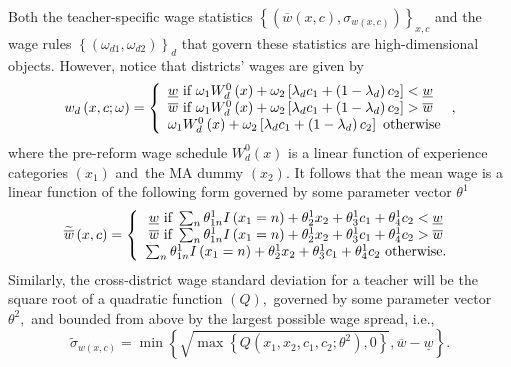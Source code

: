 \documentclass[notitlepage,12pt]{article}%
\begin{document}
Both the teacher-specific wage statistics $\left\{  \left(  \overline
{w}\left(  x,c\right)  ,\sigma_{w\left(  x,c\right)  }\right)  \right\}
_{x,c}$ and the wage rules $\left\{  \left(  \omega_{d1},\omega_{d2}\right)
\right\}  _{d}$ that govern these statistics are high-dimensional objects.
However, notice that districts' wages are given by
\begin{equation}
w_{d}\left(  x,c;\omega\right)  =\left\{
\begin{array}
[c]{l}%
\underline{w}\text{ if }\omega_{1}W_{d}^{0}\left(  x\right)  +\omega
_{2}\left[  \lambda_{d}c_{1}+\left(  1-\lambda_{d}\right)  c_{2}\right]
<\underline{w}\\
\overline{w}\text{ if }\omega_{1}W_{d}^{0}\left(  x\right)  +\omega_{2}\left[
\lambda_{d}c_{1}+\left(  1-\lambda_{d}\right)  c_{2}\right]  >\overline{w}\\
\omega_{1}W_{d}^{0}\left(  x\right)  +\omega_{2}\left[  \lambda_{d}%
c_{1}+\left(  1-\lambda_{d}\right)  c_{2}\right]  \text{ otherwise}%
\end{array}
\right.  , \label{ww}%
\end{equation}
where the pre-reform wage schedule $W_{d}^{0}\left(  x\right)  $ is a linear
function of experience categories $\left(  x_{1}\right)  $ and\ the MA dummy
$\left(  x_{2}\right)  $. It follows that the mean wage is a linear function
of the following form governed by some parameter vector $\theta^{1}$
\begin{equation}
\widetilde{\overline{w}}\left(  x,c\right)  =\left\{
\begin{array}
[c]{c}%
\underline{w}\text{ if }\sum_{n}\theta_{1n}^{1}I\left(  x_{1}=n\right)
+\theta_{2}^{1}x_{2}+\theta_{3}^{1}c_{1}+\theta_{4}^{1}c_{2}<\underline{w}\\
\overline{w}\text{ if }\sum_{n}\theta_{1n}^{1}I\left(  x_{1}=n\right)
+\theta_{2}^{1}x_{2}+\theta_{3}^{1}c_{1}+\theta_{4}^{1}c_{2}>\overline{w}\\
\sum_{n}\theta_{1n}^{1}I\left(  x_{1}=n\right)  +\theta_{2}^{1}x_{2}%
+\theta_{3}^{1}c_{1}+\theta_{4}^{1}c_{2}\text{ otherwise.}%
\end{array}
\right.  \label{w1}%
\end{equation}
Similarly, the cross-district wage standard deviation for a teacher will be
the square root of a quadratic function $\left(  Q\right)  ,$ governed by some
parameter vector $\theta^{2},$ and bounded from above by the largest possible
wage spread, i.e.,
\begin{equation}
\widetilde{\sigma}_{w\left(  x,c\right)  }=\min\left\{  \sqrt{\max\left\{
Q\left(  x_{1},x_{2},c_{1},c_{2};\theta^{2}\right)  ,0\right\}  },\overline
{w}-\underline{w}\right\}  . \label{w2}%
\end{equation}
\end{document}
